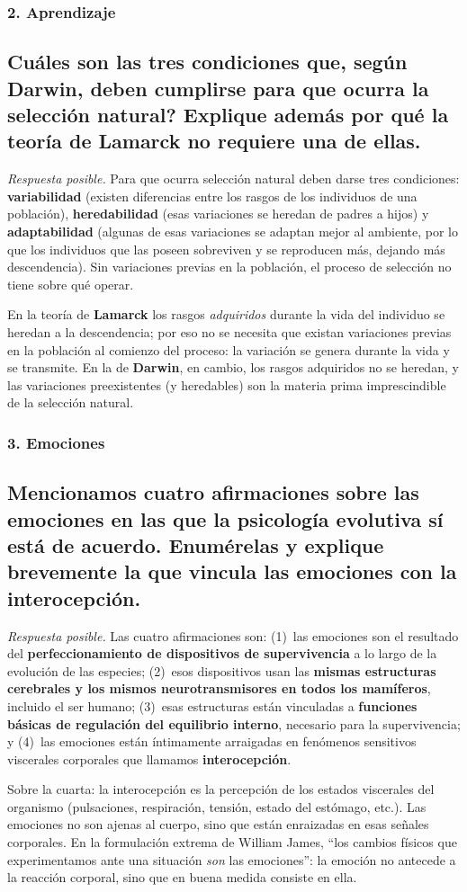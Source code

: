 \documentclass[11pt, a4paper]{article}
\newcommand{\pregunta}[1]{\subsection{#1}}
\newcommand{\eje}[1]{\subsubsection{#1}}
\begin{document}
\eje{2. Aprendizaje}
\pregunta{\textquestiondown Cu\'ales son las tres condiciones que, seg\'un Darwin, deben cumplirse para que ocurra la selecci\'on natural? Explique adem\'as por qu\'e la teor\'ia de Lamarck no requiere una de ellas.}

\begin{respuesta}
\textit{Respuesta posible.} Para que ocurra selecci\'on natural deben darse tres condiciones: \textbf{variabilidad} (existen diferencias entre los rasgos de los individuos de una poblaci\'on), \textbf{heredabilidad} (esas variaciones se heredan de padres a hijos) y \textbf{adaptabilidad} (algunas de esas variaciones se adaptan mejor al ambiente, por lo que los individuos que las poseen sobreviven y se reproducen m\'as, dejando m\'as descendencia). Sin variaciones previas en la poblaci\'on, el proceso de selecci\'on no tiene sobre qu\'e operar.

En la teor\'ia de \textbf{Lamarck} los rasgos \emph{adquiridos} durante la vida del individuo se heredan a la descendencia; por eso no se necesita que existan variaciones previas en la poblaci\'on al comienzo del proceso: la variaci\'on se genera durante la vida y se transmite. En la de \textbf{Darwin}, en cambio, los rasgos adquiridos no se heredan, y las variaciones preexistentes (y heredables) son la materia prima imprescindible de la selecci\'on natural.
\end{respuesta}

\eje{3. Emociones}
\pregunta{Mencionamos cuatro afirmaciones sobre las emociones en las que la psicolog\'ia evolutiva s\'i est\'a de acuerdo. Enum\'erelas y explique brevemente la que vincula las emociones con la interocepci\'on.}

\begin{respuesta}
\textit{Respuesta posible.} Las cuatro afirmaciones son: (1)~las emociones son el resultado del \textbf{perfeccionamiento de dispositivos de supervivencia} a lo largo de la evoluci\'on de las especies; (2)~esos dispositivos usan las \textbf{mismas estructuras cerebrales y los mismos neurotransmisores en todos los mam\'iferos}, incluido el ser humano; (3)~esas estructuras est\'an vinculadas a \textbf{funciones b\'asicas de regulaci\'on del equilibrio interno}, necesario para la supervivencia; y (4)~las emociones est\'an \'intimamente arraigadas en fen\'omenos sensitivos viscerales corporales que llamamos \textbf{interocepci\'on}.

Sobre la cuarta: la interocepci\'on es la percepci\'on de los estados viscerales del organismo (pulsaciones, respiraci\'on, tensi\'on, estado del est\'omago, etc.). Las emociones no son ajenas al cuerpo, sino que est\'an enraizadas en esas se\~nales corporales. En la formulaci\'on extrema de William James, ``los cambios f\'isicos que experimentamos ante una situaci\'on \emph{son} las emociones'': la emoci\'on no antecede a la reacci\'on corporal, sino que en buena medida consiste en ella.
\end{respuesta}
\end{document}
